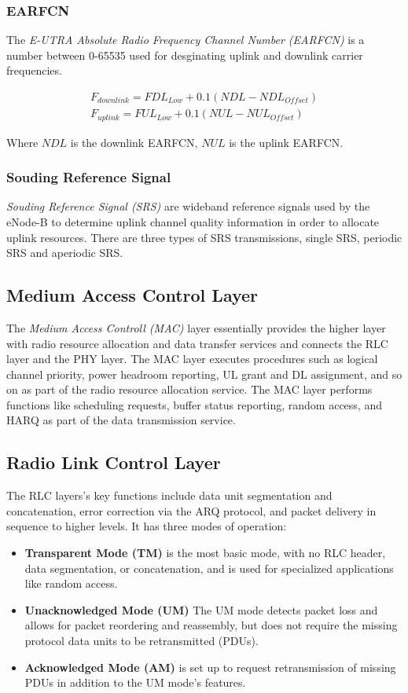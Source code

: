 \subsubsection{EARFCN}
The \textit{E-UTRA Absolute Radio Frequency Channel Number (EARFCN)} is a number between 0-65535 used
for desginating uplink and downlink carrier frequencies.

\begin{align}
  F_{downlink} = FDL_{Low} + 0.1 (NDL - NDL_{Offset})\\
  F_{uplink} = FUL_{Low} + 0.1 (NUL - NUL_{Offset})
\end{align}

Where ${NDL}$ is the downlink EARFCN, ${NUL}$ is the uplink EARFCN.

\subsubsection{Souding Reference Signal}
\textit{Souding Reference Signal (SRS)} are wideband reference signals used by the eNode-B to determine uplink channel quality information 
in order to allocate uplink resources. There are three types of SRS transmissions, single SRS, periodic SRS and aperiodic SRS.


\subsection{Medium Access Control Layer}
The \textit{Medium Access Controll (MAC)} layer essentially provides the higher layer with radio
resource allocation and data transfer services and connects the RLC layer and the PHY layer. 
The MAC layer executes procedures such as logical channel priority, power headroom reporting,
UL grant and DL assignment, and so on as part of the radio resource allocation service.
The MAC layer performs functions like scheduling requests, buffer status reporting, random access, 
and HARQ as part of the data transmission service.

\subsection{Radio Link Control Layer}
The RLC layers's key functions include data unit segmentation and concatenation, 
error correction via the ARQ protocol, and packet delivery 
in sequence to higher levels. It has three modes of operation:

\begin{itemize}[noitemsep,topsep=0pt]
  \item \textbf{Transparent Mode (TM)} is the most basic mode, with no RLC header, 
  data segmentation, or concatenation, and is used for specialized applications 
  like random access.
  \item \textbf{Unacknowledged Mode (UM)} The UM mode detects packet loss and allows 
  for packet reordering and reassembly, 
  but does not require the missing protocol data units to be retransmitted (PDUs).
  \item \textbf{Acknowledged Mode (AM)} is set up to request retransmission of missing 
  PDUs in addition to the UM mode's features.
\end{itemize}

